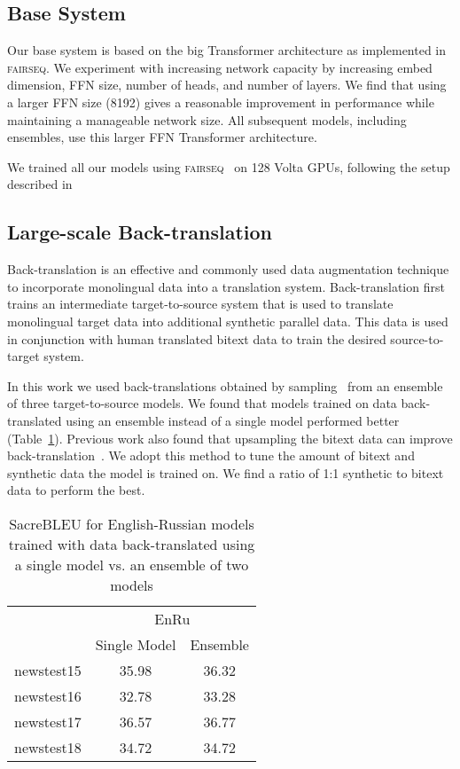 \documentclass[11pt,a4paper]{article}
\newcommand{\fairseq}{\textsc{fairseq}}
\newcommand{\entoru}{EnRu}
\begin{document}
\subsection{Base System}
Our base system is based on the big Transformer architecture \cite{vaswani2017attention} as implemented in \fairseq{}. 
We experiment with increasing network capacity by increasing embed dimension, FFN size, number of heads, and number of layers.
We find that using a larger FFN size (8192) gives a reasonable improvement in performance while maintaining a manageable network size. 
All subsequent models, including ensembles, use this larger FFN Transformer architecture.

We trained all our models using \fairseq{}~\cite{ott2019fairseq} on 128 Volta GPUs, following the setup described in~\citet{ott:scaling:2018}

\subsection{Large-scale Back-translation}
Back-translation is an effective and commonly used data augmentation technique to incorporate monolingual data into a translation system. 
Back-translation first trains an intermediate target-to-source system that is used to translate monolingual target data into additional synthetic parallel data.  
This data is used in conjunction with human translated bitext data to train the desired source-to-target system. 

In this work we used back-translations obtained by sampling~\cite{edunov2018understanding} from an ensemble of three target-to-source models. 
We found that models trained on data back-translated using an ensemble instead of a single model performed better (Table~\ref{tab:bt_ensemble_vs_single}). 
Previous work also found that upsampling the bitext data can improve back-translation~\citep{edunov2018understanding}.
We adopt this method to tune the amount of bitext and synthetic data the model is trained on.
We find a ratio of 1:1 synthetic to bitext data to perform the best.

\begin{table}[t]
\centering
\begin{tabular}{lcc}
\toprule
& \multicolumn{2}{c}{\entoru{}} \\
& Single Model & Ensemble \\ \midrule
newstest15 & 35.98 & 36.32 \\
newstest16 & 32.78 & 33.28 \\
newstest17 & 36.57 & 36.77 \\
newstest18 & 34.72 & 34.72 \\
\bottomrule
\end{tabular}
\caption{SacreBLEU for English-Russian models trained with data back-translated using a single model vs. an ensemble of two models}
\label{tab:bt_ensemble_vs_single}
\end{table}
\end{document}
